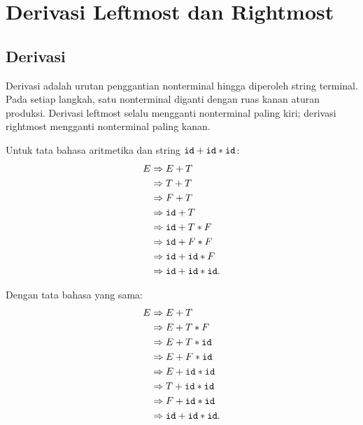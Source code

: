 \section{Derivasi Leftmost dan Rightmost}
\label{sec:ch08-derivasi}

\subsection{Derivasi}

Derivasi adalah urutan penggantian nonterminal hingga diperoleh
string terminal. Pada setiap langkah, satu nonterminal diganti dengan
ruas kanan aturan produksi. Derivasi leftmost selalu mengganti
nonterminal paling kiri; derivasi rightmost mengganti nonterminal
paling kanan.

\begin{contoh}
Untuk tata bahasa aritmetika dan string
\(\texttt{id} + \texttt{id} * \texttt{id}\):
\[
\begin{aligned}
E &\Rightarrow E + T\\
  &\Rightarrow T + T\\
  &\Rightarrow F + T\\
  &\Rightarrow \texttt{id} + T\\
  &\Rightarrow \texttt{id} + T * F\\
  &\Rightarrow \texttt{id} + F * F\\
  &\Rightarrow \texttt{id} + \texttt{id} * F\\
  &\Rightarrow \texttt{id} + \texttt{id} * \texttt{id}.
\end{aligned}
\]
\end{contoh}

\begin{contoh}
Dengan tata bahasa yang sama:
\[
\begin{aligned}
E &\Rightarrow E + T\\
  &\Rightarrow E + T * F\\
  &\Rightarrow E + T * \texttt{id}\\
  &\Rightarrow E + F * \texttt{id}\\
  &\Rightarrow E + \texttt{id} * \texttt{id}\\
  &\Rightarrow T + \texttt{id} * \texttt{id}\\
  &\Rightarrow F + \texttt{id} * \texttt{id}\\
  &\Rightarrow \texttt{id} + \texttt{id} * \texttt{id}.
\end{aligned}
\]
\end{contoh}

